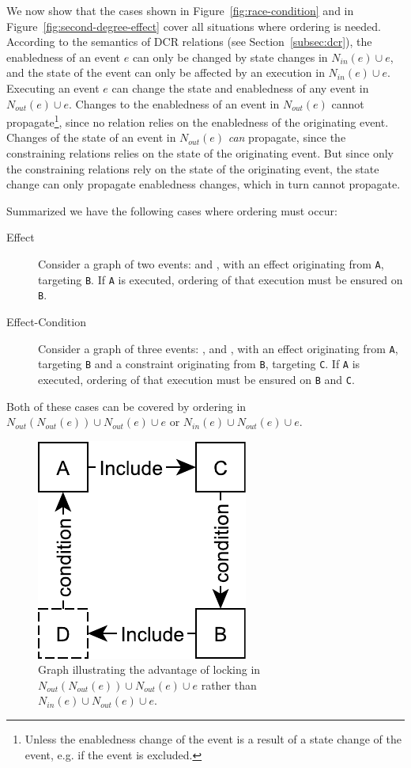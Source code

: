 \documentclass{article}
\begin{document}
	We now show that the cases shown in Figure~\ref{fig:race-condition} and in Figure~\ref{fig:second-degree-effect} cover all situations where ordering is needed.
	According to the semantics of DCR relations (see Section~\ref{subsec:dcr}), the enabledness of an event $e$ can only be changed by state changes in $N_{in}(e) \cup e$, and the state of the event can only be affected by an execution in $N_{in}(e) \cup e$.
	Executing an event $e$ can change the state and enabledness of any event in $N_{out}(e) \cup e$.
	Changes to the enabledness of an event in $N_{out}(e)$ cannot propagate\footnote{Unless the enabledness change of the event is a result of a state change of the event, e.g. if the event is excluded.}, since no relation relies on the enabledness of the originating event.
	Changes of the state of an event in $N_{out}(e)$ \textit{can} propagate, since the constraining relations relies on the state of the originating event.
	But since only the constraining relations rely on the state of the originating event, the state change can only propagate enabledness changes, which in turn cannot propagate.

	Summarized we have the following cases where ordering must occur:
	\begin{description}
		\item[Effect] Consider a graph of two events:  and , with an effect originating from \texttt{A}, targeting \texttt{B}.
		If \texttt{A} is executed, ordering of that execution must be ensured on \texttt{B}.
		\item[Effect-Condition] Consider a graph of three events: ,  and , with an effect originating from \texttt{A}, targeting \texttt{B} and a constraint originating from \texttt{B}, targeting \texttt{C}.
		If \texttt{A} is executed, ordering of that execution must be ensured on \texttt{B} and \texttt{C}.
	\end{description}
	Both of these cases can be covered by ordering in $N_{out}(N_{out}(e)) \cup N_{out}(e) \cup e$ or $N_{in}(e) \cup N_{out}(e) \cup e$.

	\begin{figure}[ht]
		\center
		\includegraphics[scale=0.5]{figures/dcr-graphs/second-degree-no-effect.pdf}
		\caption{Graph illustrating the advantage of locking in $N_{out}(N_{out}(e)) \cup N_{out}(e) \cup e$ rather than $N_{in}(e) \cup N_{out}(e) \cup e$.}
		\label{fig:second-degree-no-effect}
	\end{figure}
	\FloatBarrier
\end{document}
